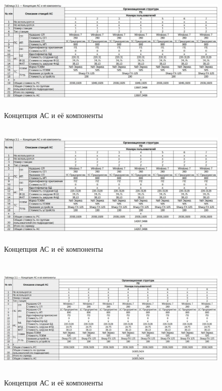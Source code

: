 \documentclass[12pt, a4paper, simple]{eskdtext}
\begin{document}
    \newpage

    \begin{figure}[!hp]
        \centering
        \includegraphics[height=6cm]
            {_docs/Таблица3-1КонцепцияАСИЕеКомпонентыП1.jpg}
        \caption{Концепция АС и её компоненты}
    \end{figure}

    \begin{figure}[!hp]
        \centering
        \includegraphics[height=6cm]
            {_docs/Таблица3-1КонцепцияАСИЕеКомпонентыП2.jpg}
        \caption{Концепция АС и её компоненты}
    \end{figure}

    \begin{figure}[!hp]
        \centering
        \includegraphics[height=6cm]
            {_docs/Таблица3-1КонцепцияАСИЕеКомпонентыП3.jpg}
        \caption{Концепция АС и её компоненты}
    \end{figure}
\end{document}
